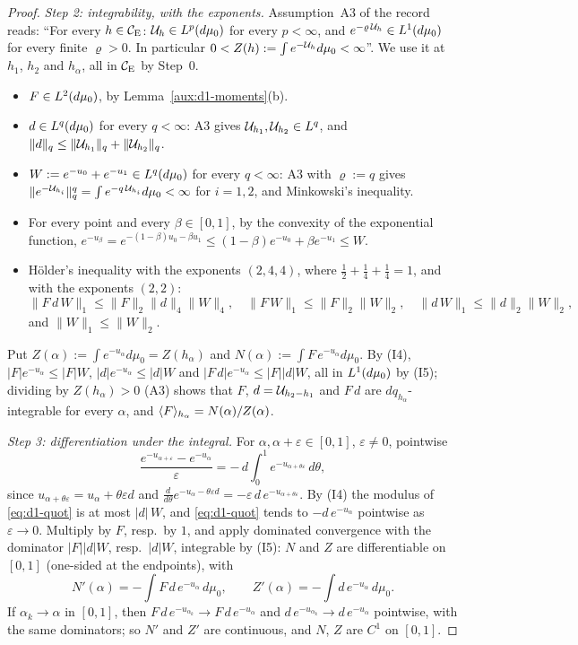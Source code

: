 \begin{proof}
\emph{Step 2: integrability, with the exponents.} Assumption~A3 of the record
\cite[p.~8]{R} reads: ``For every $h\in\mathcal{C}_{\mathrm E}$: $\mathcal U_h\in L^p(d\mu_0)$ for every $p<\infty$, and
$e^{-\varrho\,\mathcal U_h}\in L^1(d\mu_0)$ for every finite $\varrho>0$. In particular
$0<Z(h):=\int e^{-\mathcal U_h}d\mu_0<\infty$''. We use it at $h_1$, $h_2$ and $h_\alpha$, all in
$\mathcal{C}_{\mathrm E}$ by Step~0.
\begin{itemize}
\item[(I1)] $F\in L^2(d\mu_0)$, by Lemma~\ref{aux:d1-moments}(b).
\item[(I2)] $d\in L^q(d\mu_0)$ for every $q<\infty$: A3 gives $\mathcal U_{h_1},\mathcal U_{h_2}\in L^q$, and
$\|d\|_q\le\|\mathcal U_{h_1}\|_q+\|\mathcal U_{h_2}\|_q$.
\item[(I3)] $W:=e^{-u_0}+e^{-u_1}\in L^q(d\mu_0)$ for every $q<\infty$: A3 with $\varrho:=q$ gives
$\|e^{-\mathcal U_{h_i}}\|_q^q=\int e^{-q\,\mathcal U_{h_i}}d\mu_0<\infty$ for $i=1,2$, and Minkowski's
inequality.
\item[(I4)] For every point and every $\beta\in[0,1]$, by the convexity of the exponential
function, $e^{-u_\beta}=e^{-(1-\beta)u_0-\beta u_1}\le(1-\beta)e^{-u_0}+\beta e^{-u_1}\le W$.
\item[(I5)] H\"older's inequality with the exponents $(2,4,4)$, where
$\frac12+\frac14+\frac14=1$, and with the exponents $(2,2)$:
\[
 \|F\,d\,W\|_1\le\|F\|_2\|d\|_4\|W\|_4,\quad
 \|F\,W\|_1\le\|F\|_2\|W\|_2,\quad \|d\,W\|_1\le\|d\|_2\|W\|_2,
\]
and $\|W\|_1\le\|W\|_2$.
\end{itemize}
Put $Z(\alpha):=\int e^{-u_\alpha}d\mu_0=Z(h_\alpha)$ and $N(\alpha):=\int F\,e^{-u_\alpha}d\mu_0$.
By (I4), $|F|e^{-u_\alpha}\le|F|W$, $|d|e^{-u_\alpha}\le|d|W$ and
$|F\,d|e^{-u_\alpha}\le|F||d|W$, all in $L^1(d\mu_0)$ by (I5); dividing by $Z(h_\alpha)>0$ (A3)
shows that $F$, $d=\mathcal U_{h_2-h_1}$ and $F\,d$ are $dq_{h_\alpha}$-integrable for every $\alpha$,
and $\langle F\rangle_{h_\alpha}=N(\alpha)/Z(\alpha)$.

\emph{Step 3: differentiation under the integral.} For $\alpha,\alpha+\varepsilon\in[0,1]$,
$\varepsilon\ne0$, pointwise
\begin{equation}\label{eq:d1-quot}
 \frac{e^{-u_{\alpha+\varepsilon}}-e^{-u_\alpha}}{\varepsilon}
 =-\,d\int_0^1e^{-u_{\alpha+\theta\varepsilon}}\,d\theta ,
\end{equation}
since $u_{\alpha+\theta\varepsilon}=u_\alpha+\theta\varepsilon d$ and
$\frac{d}{d\theta}e^{-u_\alpha-\theta\varepsilon d}=-\varepsilon\,d\,
e^{-u_{\alpha+\theta\varepsilon}}$. By (I4) the modulus of \eqref{eq:d1-quot} is at most
$|d|\,W$, and \eqref{eq:d1-quot} tends to $-d\,e^{-u_\alpha}$ pointwise as $\varepsilon\to0$.
Multiply by $F$, resp.\ by $1$, and apply dominated convergence with the dominator
$|F||d|W$, resp.\ $|d|W$, integrable by (I5): $N$ and $Z$ are differentiable on $[0,1]$
(one-sided at the endpoints), with
\[
 N'(\alpha)=-\int F\,d\,e^{-u_\alpha}\,d\mu_0,\qquad Z'(\alpha)=-\int d\,e^{-u_\alpha}\,d\mu_0 .
\]
If $\alpha_k\to\alpha$ in $[0,1]$, then $F\,d\,e^{-u_{\alpha_k}}\to F\,d\,e^{-u_\alpha}$ and
$d\,e^{-u_{\alpha_k}}\to d\,e^{-u_\alpha}$ pointwise, with the same dominators; so $N'$ and $Z'$
are continuous, and $N$, $Z$ are $C^1$ on $[0,1]$.


\end{proof}
